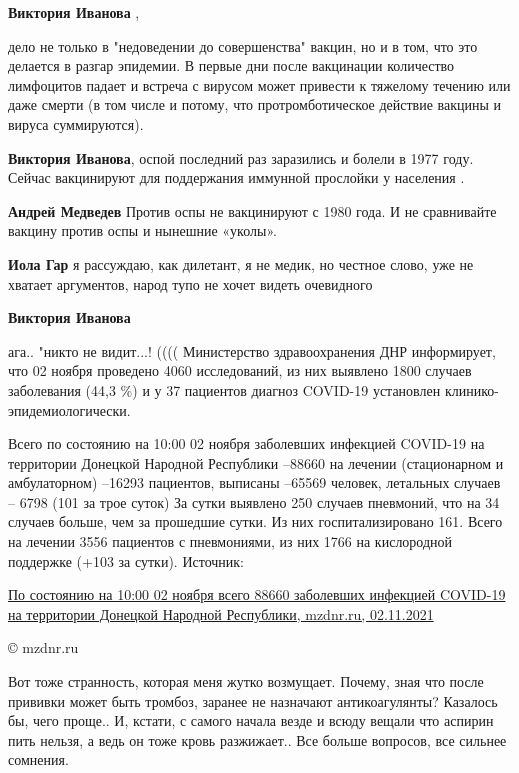 \begin{itemize}
\begin{itemize}
\textbf{Виктория Иванова} , 

дело не только в "недоведении до совершенства" вакцин, но и в том, что это
делается в разгар эпидемии. В первые дни после вакцинации количество лимфоцитов
падает и встреча с вирусом может привести к тяжелому течению или даже смерти (в
том числе и потому, что протромботическое действие вакцины и вируса
суммируются).

\textbf{Виктория Иванова}, оспой последний раз заразились и болели в 1977 году. Сейчас вакцинируют для поддержания иммунной прослойки у населения .

\textbf{Андрей Медведев} Против оспы не вакцинируют с 1980 года. И не сравнивайте вакцину против оспы и нынешние «уколы».

\textbf{Иола Гар} я рассуждаю, как дилетант, я не медик, но честное слово, уже не хватает аргументов, народ тупо не хочет видеть очевидного

\textbf{Виктория Иванова} 

ага.. "никто не видит...! (((( Министерство здравоохранения ДНР информирует,
что 02 ноября проведено 4060 исследований, из них выявлено 1800 случаев
заболевания (44,3 \%) и у 37 пациентов диагноз COVID-19 установлен
клинико-эпидемиологически.

Всего по состоянию на 10:00 02 ноября заболевших инфекцией COVID-19 на территории Донецкой Народной Республики –88660
на лечении (стационарном и амбулаторном) –16293 пациентов,
выписаны –65569 человек,
летальных случаев – 6798 (101 за трое суток)
За сутки выявлено 250 случаев пневмоний, что на 34 случаев больше, чем за прошедшие сутки. Из них госпитализировано 161. Всего на лечении 3556 пациентов с пневмониями, из них 1766 на кислородной поддержке (+103 за сутки).
Источник: 

\href{https://mzdnr.ru/news/po-sostoyaniyu-na-1000-02-noyabrya-vsego-88660-zabolevshih-infekciey-covid-19-na-territorii}{%
По состоянию на 10:00 02 ноября всего 88660 заболевших инфекцией COVID-19 на территории Донецкой Народной Республики, %
mzdnr.ru, 02.11.2021%
}

© mzdnr.ru
\end{itemize} %


Вот тоже странность, которая меня жутко возмущает. Почему, зная что после прививки
может быть тромбоз, заранее не назначают антикоагулянты? Казалось бы, чего
проще.. И, кстати, с самого начала везде и всюду вещали что аспирин пить нельзя, а
ведь он тоже кровь разжижает.. Все больше вопросов, все сильнее сомнения.


\end{itemize}
